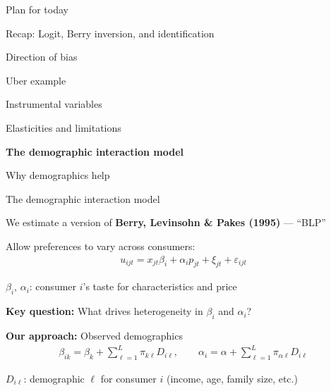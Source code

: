 \documentclass[notes,11pt, aspectratio=169]{beamer}
\newenvironment{wideitemize}{\itemize\addtolength{\itemsep}{10pt}}{\enditemize}
\newenvironment{wideenumerate}{\enumerate\addtolength{\itemsep}{10pt}}{\endenumerate}
\begin{document}

\begin{frame}{Plan for today}
  \begin{wideenumerate}
    \item Recap: Logit, Berry inversion, and identification
    \item Direction of bias
    \item Uber example
    \item Instrumental variables
    \item Elasticities and limitations
    \item \textbf{The demographic interaction model}
    \item Why demographics help
  \end{wideenumerate}
\end{frame}

\begin{frame}{The demographic interaction model}
	\begin{wideitemize}
		\item We estimate a version of \textbf{Berry, Levinsohn \& Pakes (1995)} --- ``BLP''
		\item Allow preferences to vary across consumers:
		\begin{align*}
			u_{ijt} = x_{jt} \beta_i + \alpha_i p_{jt} + \xi_{jt} + \varepsilon_{ijt}
		\end{align*}
		\item $\beta_i$, $\alpha_i$: consumer $i$'s taste for characteristics and price
		\item \textbf{Key question:} What drives heterogeneity in $\beta_i$ and $\alpha_i$?
		\item \textbf{Our approach:} Observed demographics
		\begin{align*}
			\beta_{ik} = \beta_k + \sum_{\ell=1}^L \pi_{k\ell} D_{i\ell}, \qquad \alpha_i = \alpha + \sum_{\ell=1}^L \pi_{\alpha\ell} D_{i\ell}
		\end{align*}
		\item $D_{i\ell}$: demographic $\ell$ for consumer $i$ (income, age, family size, etc.)
	\end{wideitemize}
\end{frame}
\end{document}
